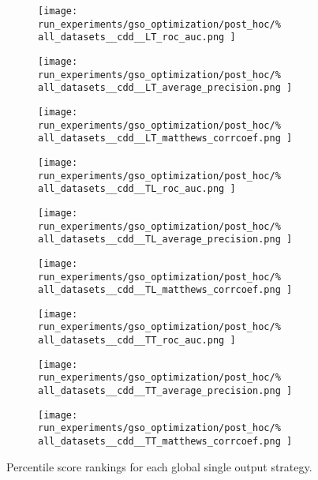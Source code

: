 \documentclass[conference]{IEEEtran}
\begin{document}
\begin{figure*}
    \centering
    \begin{subfigure}{0.32\textwidth}
        \texttt{[image: 
            run\_experiments/gso\_optimization/post\_hoc/\%
            all\_datasets\_\_cdd\_\_LT\_roc\_auc.png
        ]}
    \end{subfigure}
    \begin{subfigure}{0.32\textwidth}
        \texttt{[image: 
            run\_experiments/gso\_optimization/post\_hoc/\%
            all\_datasets\_\_cdd\_\_LT\_average\_precision.png
        ]}
    \end{subfigure}
    \begin{subfigure}{0.32\textwidth}
        \texttt{[image: 
            run\_experiments/gso\_optimization/post\_hoc/\%
            all\_datasets\_\_cdd\_\_LT\_matthews\_corrcoef.png
        ]}
    \end{subfigure}

    \begin{subfigure}{0.32\textwidth}
        \texttt{[image: 
            run\_experiments/gso\_optimization/post\_hoc/\%
            all\_datasets\_\_cdd\_\_TL\_roc\_auc.png
        ]}
    \end{subfigure}
    \begin{subfigure}{0.32\textwidth}
        \texttt{[image: 
            run\_experiments/gso\_optimization/post\_hoc/\%
            all\_datasets\_\_cdd\_\_TL\_average\_precision.png
        ]}
    \end{subfigure}
    \begin{subfigure}{0.32\textwidth}
        \texttt{[image: 
            run\_experiments/gso\_optimization/post\_hoc/\%
            all\_datasets\_\_cdd\_\_TL\_matthews\_corrcoef.png
        ]}
    \end{subfigure}

    \begin{subfigure}{0.32\textwidth}
        \texttt{[image: 
            run\_experiments/gso\_optimization/post\_hoc/\%
            all\_datasets\_\_cdd\_\_TT\_roc\_auc.png
        ]}
    \end{subfigure}
    \begin{subfigure}{0.32\textwidth}
        \texttt{[image: 
            run\_experiments/gso\_optimization/post\_hoc/\%
            all\_datasets\_\_cdd\_\_TT\_average\_precision.png
        ]}
    \end{subfigure}
    \begin{subfigure}{0.32\textwidth}
        \texttt{[image: 
            run\_experiments/gso\_optimization/post\_hoc/\%
            all\_datasets\_\_cdd\_\_TT\_matthews\_corrcoef.png
        ]}
    \end{subfigure}
    \caption{Percentile score rankings for each global single output strategy.}
    \label{fig:cdd_gso_models}
\end{figure*}
\end{document}
